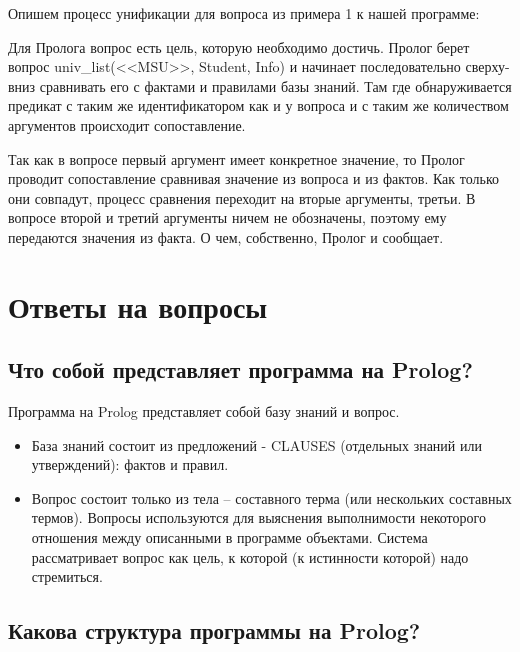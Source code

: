 \documentclass[a4paper,12pt]{article}
\begin{document}
	Опишем процесс унификации для вопроса из примера 1 к нашей программе:
	
	Для Пролога вопрос есть цель, которую необходимо достичь. Пролог берет вопрос univ\_list(<<MSU>>, Student, Info) и начинает последовательно сверху-вниз сравнивать его с фактами и правилами базы знаний. Там где обнаруживается предикат с таким же идентификатором как и у вопроса и с таким же количеством аргументов происходит сопоставление.
	
	Так как в вопросе первый аргумент имеет конкретное значение, то Пролог проводит сопоставление сравнивая значение из вопроса и из фактов. Как только они совпадут, процесс сравнения переходит на вторые аргументы, третьи. В вопросе второй и третий аргументы ничем не обозначены, поэтому ему передаются значения из факта. О чем, собственно, Пролог и сообщает.

	
	\section{Ответы на вопросы}
	
	\subsection{Что собой представляет программа на Prolog?}
	
	Программа на Prolog представляет собой базу знаний и вопрос.
	
	\begin{itemize}
		\item База знаний состоит из предложений - CLAUSES (отдельных знаний или утверждений): фактов и правил.
		
		\item Вопрос состоит только из тела – составного терма (или нескольких составных термов). Вопросы используются для выяснения выполнимости некоторого отношения между описанными в программе объектами. Система рассматривает вопрос как цель, к которой (к истинности которой) надо стремиться.
	\end{itemize}
	
	\subsection{Какова структура программы на Prolog?}
	
\end{document}
